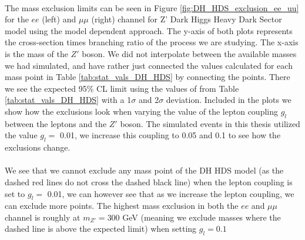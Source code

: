 \documentclass[12pt, a4paper]{book}
\begin{document}
\\The mass exclusion limits can be seen in Figure \ref{fig:DH_HDS_exclusion_ee_uu} for the $ee$ (left) and $\mu\mu$ (right) channel for Z' Dark Higgs Heavy Dark Sector model using the model dependent approach. The y-axis of both plots represents the cross-section times branching ratio of the process we are studying. 
The x-axis is the mass of the $Z'$ boson. We did not interpolate between the available masses we had simulated, and have rather just connected the values calculated for each mass point in Table \ref{tab:stat_vals_DH_HDS} by connecting the points. There we see the expected 95\% CL limit using 
the values of from Table \ref{tab:stat_vals_DH_HDS} with a 1$\sigma$ and 2$\sigma$ deviation. Included in the plots we show how the exclusions look when varying the value of the lepton coupling $g_l$ between the leptons and the $Z'$ boson. The simulated events in this thesis utilized the value $g_l=$ 0.01, 
we increase this coupling to 0.05 and 0.1 to see how the exclusions change.\\
\\We see that we cannot exclude any mass point of the DH HDS model (as the dashed red lines do not cross the dashed black line) when the lepton coupling is set to $g_l=$ 0.01, we can however see that as we increase the lepton coupling, 
we can exclude more points. The highest mass exclusion in both the $ee$ and $\mu\mu$ channel is roughly at $m_{Z'}=300$ GeV (meaning we exclude masses where the dashed line is above the expected limit) when setting $g_{l}=0.1$
\clearpage
\end{document}
